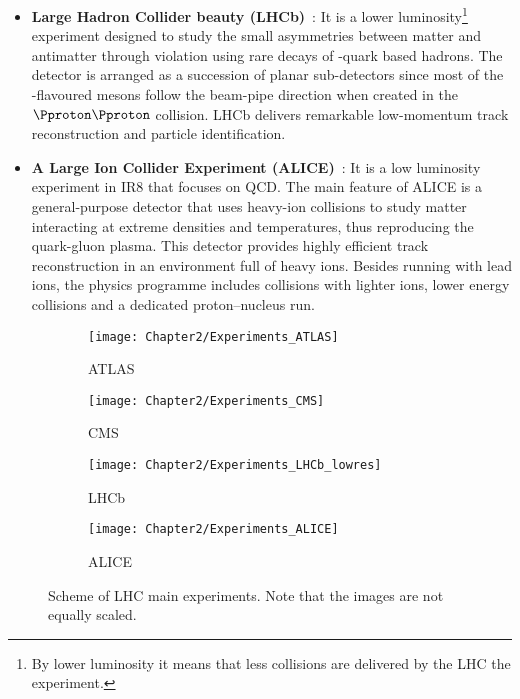 \begin{itemize}
		
  \item \textbf{Large Hadron Collider beauty (LHCb)}~\cite{LHCb:2008vvz}:
    		It is a lower luminosity\footnote{By lower luminosity it means that less collisions are delivered by the LHC the experiment.}
		 experiment designed to study the small asymmetries between matter and antimatter through \CP violation using rare decays
		of \Pbottom-quark based hadrons. 
		The detector is arranged as a succession of planar sub-detectors %
		since most of the \Pbottom-flavoured mesons follow the beam-pipe direction
		when created in the $\Pproton \Pproton$ collision. LHCb delivers remarkable low-momentum track reconstruction and particle identification. 

  \item \textbf{A Large Ion Collider Experiment (ALICE)}~\cite{ALICE_Collaboration_2008}:
  		It is a low luminosity experiment in IR8 that focuses on QCD. %
		The main feature of ALICE is a  general-purpose detector that uses heavy-ion collisions to 
		 study matter interacting at extreme densities and temperatures, thus reproducing the quark-gluon plasma.
		 This detector provides highly efficient 
		 track reconstruction in an environment full of heavy ions.
		 Besides running with lead ions, the physics programme includes collisions with lighter ions, 
		 lower energy collisions and a dedicated proton--nucleus run.

\end{itemize}


\begin{figure}[ht] 
  \begin{subfigure}[b]{0.5\linewidth}
    \centering
    \texttt{[image: Chapter2/Experiments\_ATLAS]} 
    \caption{ATLAS} 
    \label{fig7:Chap2:LHC_experiments:ATLAS} 
    \vspace{4ex}
  \end{subfigure}%
  \begin{subfigure}[b]{0.5\linewidth}
    \centering
   \texttt{[image: Chapter2/Experiments\_CMS]}
    \caption{CMS} 
    \label{fig7:Chap2:LHC_experiments:CMS} 
    \vspace{4ex}
  \end{subfigure} 
  \begin{subfigure}[b]{0.5\linewidth}
    \centering
    \texttt{[image: Chapter2/Experiments\_LHCb\_lowres]}
    \caption{LHCb} 
    \label{fig7:Chap2:LHC_experiments:LHCb} 
  \end{subfigure}%
  \begin{subfigure}[b]{0.5\linewidth}
    \centering
    \texttt{[image: Chapter2/Experiments\_ALICE]}
    \caption{ALICE} 
    \label{fig7:Chap2:LHC_experiments:ALICE} 
  \end{subfigure} 
  \caption{Scheme of LHC main experiments. Note that the images are not equally scaled.}
  \label{fig7:Chap2:LHC_experiments} 
\end{figure}

